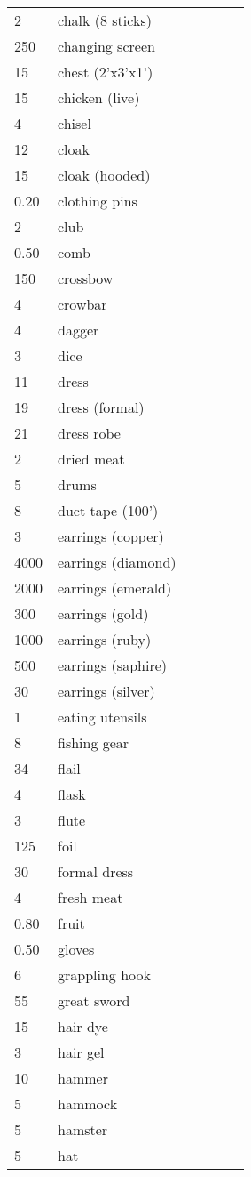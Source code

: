 \documentclass{article}
\begin{document}
\begin{longtable}{@{}p{0.18\linewidth} p{0.8\linewidth}}
2 & chalk (8 sticks)\\
250 & changing screen\\
15 & chest (2'x3'x1')\\
15 & chicken (live)\\
4 & chisel\\
12 & cloak\\
15 & cloak (hooded)\\
0.20 & clothing pins\\
2 & club\\
0.50 & comb\\
150 & crossbow\\
4 & crowbar\\
4 & dagger\\
3 & dice\\
11 & dress\\
19 & dress (formal)\\
21 & dress robe\\
2 & dried meat\\
5 & drums\\
8 & duct tape (100')\\
3 & earrings (copper)\\
4000 & earrings (diamond)\\
2000 & earrings (emerald)\\
300 & earrings (gold)\\
1000 & earrings (ruby)\\
500 & earrings (saphire)\\
30 & earrings (silver)\\
1 & eating utensils\\
8 & fishing gear\\
34 & flail\\
4 & flask\\
3 & flute\\
125 & foil\\
30 & formal dress\\
4 & fresh meat\\
0.80 & fruit\\
0.50 & gloves\\
6 & grappling hook\\
55 & great sword\\
15 & hair dye\\
3 & hair gel\\
10 & hammer\\
5 & hammock\\
5 & hamster\\
5 & hat\\

\end{longtable}
\end{document}

